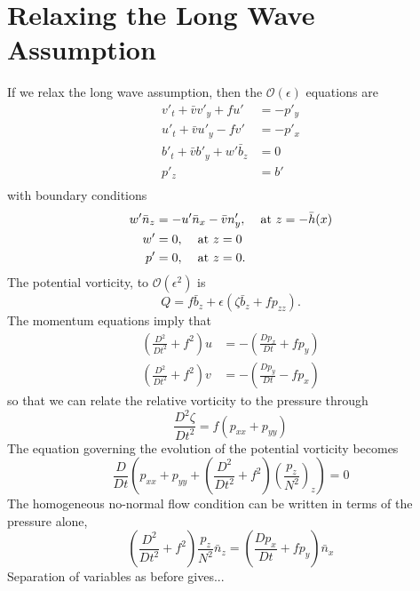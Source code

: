 \documentclass[12pt]{workjournal}
\begin{document}
\section{Relaxing the Long Wave Assumption}
If we relax the long wave assumption, then the $\mathcal{O}(\epsilon)$ equations are
   \begin{subequations}
   \begin{align}
   v'_t + \bar{v} v'_y + f u' &= -p'_y \\
   u'_t + \bar{v} u'_y - f v' &= -p'_x\\
   b'_t + \bar{v} b'_y  + w' \bar{b}_z &= 0 \\
   p'_z &= b' \\
   \end{align}\label{eq:OrderEpsilonShort}
   \end{subequations}   
  with boundary conditions
     \begin{subequations}
   \begin{align}
   w'\bar{n}_z &= -u' \bar{n}_x - \bar{v}n'_y, \hspace{4mm} \text{at } z=-\bar{h}(x) \\
   w' &= 0 , \hspace{4mm} \text{at } z=0 \\
   p' &= 0, \hspace{4mm} \text{at } z=0.
   \end{align}
   \end{subequations} 
The potential vorticity, to $\mathcal{O}(\epsilon^2)$ is
\begin{equation}
Q = f\bar{b}_z + \epsilon( \zeta \bar{b}_z + f p_{zz} ).
\end{equation}
The momentum equations imply that 
\begin{subequations}
\begin{align}
\left(\frac{D^2}{Dt^2} + f^2\right)u &= -( \frac{Dp_x}{Dt} + fp_y) \\
\left(\frac{D^2}{Dt^2} + f^2\right)v &= -( \frac{Dp_y}{Dt} - fp_x) 
\end{align}
\end{subequations}
so that we can relate the relative vorticity to the pressure through
\begin{equation}
\frac{D^2 \zeta}{Dt^2} = f (p_{xx} + p_{yy} )
\end{equation}
The equation governing the evolution of the potential vorticity becomes
\begin{equation}
\frac{D}{Dt}\left( p_{xx} + p_{yy} + \left(\frac{D^2}{Dt^2} + f^2 \right)\left(\frac{p_z}{N^2} \right)_z\right) =0
\end{equation}
The homogeneous no-normal flow condition can be written in terms of the pressure alone,
\begin{equation}
\left(\frac{D^2}{Dt^2} + f^2\right)\frac{p_z}{N^2}\bar{n}_z = ( \frac{Dp_x}{Dt} + fp_y) \bar{n}_x
\end{equation}
Separation of variables as before gives...
\pagebreak



\end{document}
